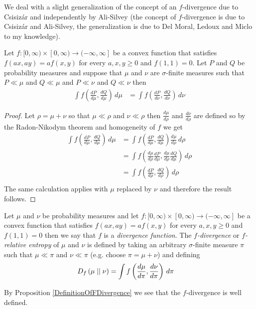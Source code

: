 We deal with a slight generalization of the concept of an $f$-divergence due to Csisiz\'{a}r and independently by Ali-Silvey (the concept of $f$-divergence is due to Csisiz\'{a}r and Ali-Silvey, the generalization is due to Del Moral, Ledoux and Miclo to my knowledge).
\begin{prop}\label{DefinitionOfFDivergence}Let $f : [0,\infty) \times
  [0, \infty) \to (-\infty, \infty]$ be a convex function that satisfies
  $f(ax, ay) = af(x,y)$ for every $a,x,y \geq 0$ and $f(1,1) = 0$.
  Let $P$ and $Q$ be probability measures and suppose that $\mu$ and $\nu$ are $\sigma$-finite measures such that $P \ll \mu$ and $Q \ll \mu$ and $P \ll \nu$ and $Q \ll \nu$ then
\begin{align*}
\int f \left ( \frac{d P}{d \mu}, \frac{d Q}{d \mu} \right ) \, d \mu &= \int f \left ( \frac{d P}{d \nu}, \frac{d Q}{d \nu} \right ) \, d \nu
\end{align*}
\end{prop}
\begin{proof}
Let $\rho = \mu + \nu$ so that $\mu \ll \rho$ and $\nu \ll \rho$ then $\frac{d \mu}{d \rho}$ and $\frac{d \nu}{d \rho}$ are defined so by the Radon-Nikodym theorem and homogeneity of $f$ we get
\begin{align*}
\int f \left ( \frac{d P}{d \mu}, \frac{d Q}{d \mu} \right ) \, d \mu  &= \int f \left ( \frac{d P}{d \mu}, \frac{d Q}{d \mu} \right ) \frac{d \mu}{d \rho} \, d \rho \\
&=\int f \left ( \frac{d \mu}{d \rho} \frac{d P}{d \mu}, \frac{d \mu}{d \rho} \frac{d Q}{d \mu} \right ) \, d \rho \\
&=\int f \left ( \frac{d P}{d \rho}, \frac{d Q}{d \rho} \right ) \, d \rho \\
\end{align*}
The same calculation applies with $\mu$ replaced by $\nu$ and therefore the result follows.
\end{proof}

\begin{defn}Let $\mu$ and $\nu$ be probability measures and let $f : [0,\infty) \times
  [0, \infty) \to (-\infty, \infty]$ be a convex function that satisfies
  $f(ax, ay) = af(x,y)$ for every $a,x,y \geq 0$ and $f(1,1) = 0$ then we say that $f$ is a \emph{divergence function}.  The \emph{$f$-divergence} or \emph{$f$-relative entropy}  of $\mu$ and $\nu$ is defined by taking
an arbitrary $\sigma$-finite measure $\pi$ such that $\mu \ll \pi$ and $\nu \ll \pi$  (e.g. choose $\pi = \mu + \nu$) and defining
\begin{align*}
D_{f}\left( \mu \mid\mid \nu \right) &= \int f \left ( \frac{d \mu}{d \pi}, \frac{d \nu}{d \pi} \right ) \, d \pi
\end{align*}
\end{defn}
By Proposition \ref{DefinitionOfFDivergence} we see that the $f$-divergence is well defined.

